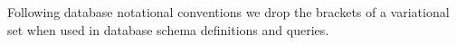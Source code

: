 Following database notational conventions
we drop the brackets of a variational set when used in database
schema definitions and queries.


